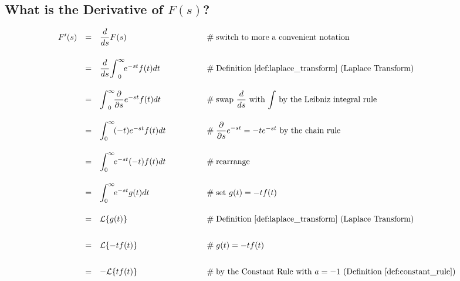 \documentclass{article}
\theoremstyle{definition}
\begin{document}
\bigskip
\subsection{What is the Derivative of $F(s)$?}

\bigskip
\begin{equation*}
\begin{array}{lllll}
F^\prime(s)
&=& \dfrac{d}{ds} F(s)                                                                                        &\qquad \qquad \mathrel{\#} \text{switch to more a convenient notation}                                                                   \\
[20pt]
&=& \dfrac{d}{ds} \mathlarger{\int} ^\infty_0 \! e^{-st}  f(t) dt                              &\qquad \qquad \mathrel{\#} \text{Definition \ref{def:laplace_transform} (Laplace Transform)}                                  \\  
[20pt]
&=& \mathlarger{\int} ^\infty_0 \! \dfrac{\partial}{\partial s} e^{-st}  f(t) dt           &\qquad \qquad \mathrel{\#} \text{swap $\dfrac{d}{ds}$ with $\mathlarger{\int}$ by the Leibniz integral rule}            \\                                                                                    
[20pt]
&=&  \mathlarger{\int}^\infty_0 \! (-t) e^{-st} f(t) dt                                             &\qquad \qquad \mathrel{\#} \mathlarger{\dfrac{\partial}{\partial s} e^{-st}} = -t e^{-st} \text{ by the chain rule}           \\
[20pt]
&=&  \mathlarger{\int}^\infty_0 \! e^{-st}  (-t) f(t) dt                                            &\qquad \qquad \mathrel{\#} \text{rearrange}                                                                                                                \\
[20pt]
&=&  \mathlarger{\int}^\infty_0 \! e^{-st} g(t) dt                                                  &\qquad \qquad \mathrel{\#} \text{set $g(t) = -t f(t)$}                                                                                                    \\
[20pt]
&=& \mathcal{L}\{g(t)\}                                                                                       &\qquad \qquad \mathrel{\#} \text{Definition \ref{def:laplace_transform} (Laplace Transform)}                                   \\
[20pt]
&=& \mathcal{L}\{-tf(t)\}                                                                                     &\qquad \qquad \mathrel{\#} g(t) = -t f(t)                                                                                                                       \\
[20pt]
&=& -\mathcal{L}\{tf(t)\}                                                                                    &\qquad \qquad \mathrel{\#} \text{by the Constant Rule with $a = -1$ (Definition \ref{def:constant_rule})}
\end{array}
\end{equation*}
\end{document}
